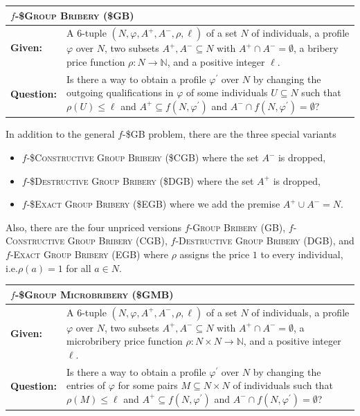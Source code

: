 \documentclass[
    12pt,               %
    a4paper,            %
    bibtotoc,           %
    pointlessnumbers,   %
    ngerman,            %
    titlepage,          %
    leqno,              %
    ]{scrarticle}       %
\begin{document}
\bigskip

\begin{tabularx}{\textwidth}{lX}
\hline
\multicolumn{2}{l}{
$f$-\textsc{\$Group Bribery} (\$GB)
} \\
\hline
\textbf{Given:} &
A 6-tuple $(N, \varphi, A^+, A^-, \rho, \ell)$ of a set $N$ of individuals, a profile $\varphi$ over $N$, two subsets $A^+, A^- \subseteq N$ with $A^+ \cap A^- = \emptyset$, a bribery price function $\rho : N \rightarrow \mathbb{N}$, and a positive integer $\ell$. \\
\textbf{Question:} &
Is there a way to obtain a profile $\varphi^\prime$ over $N$ by changing the outgoing qualifications in $\varphi$ of some individuals $U \subseteq N$ such that $\rho(U) \leq \ell$ and $A^+ \subseteq f(N, \varphi^\prime)$ and $A^- \cap f(N, \varphi^\prime) = \emptyset$? \\
\hline
\end{tabularx}



In addition to the general $f$-\$GB problem, there are the three special variants
\begin{itemize}
\item
$f$-\textsc{\$Constructive Group Bribery} (\$CGB) where the set $A^-$ is dropped,
\item
$f$-\textsc{\$Destructive Group Bribery} (\$DGB) where the set $A^+$ is dropped,
\item
$f$-\textsc{\$Exact Group Bribery} (\$EGB) where we add the premise $A^+ \cup A^- = N$.
\end{itemize}

Also, there are the four unpriced versions $f$-\textsc{Group Bribery} (GB), $f$-\textsc{Constructive Group Bribery} (CGB), $f$-\textsc{Destructive Group Bribery} (DGB), and $f$-\textsc{Exact Group Bribery} (EGB) where $\rho$ assigns the price $1$ to every individual, i.e.\@ $\rho(a) = 1$ for all $a \in N$.



\bigskip

\begin{tabularx}{\textwidth}{lX}
\hline
\multicolumn{2}{l}{
$f$-\textsc{\$Group Microbribery} (\$GMB)
} \\
\hline
\textbf{Given:} &
A 6-tuple $(N, \varphi, A^+, A^-, \rho, \ell)$ of a set $N$ of individuals, a profile $\varphi$ over $N$, two subsets $A^+, A^- \subseteq N$ with $A^+ \cap A^- = \emptyset$, a microbribery price function $\rho : N \times N \rightarrow \mathbb{N}$, and a positive integer $\ell$. \\
\textbf{Question:} &
Is there a way to obtain a profile $\varphi^\prime$ over $N$ by changing the entries of $\varphi$ for some pairs $M \subseteq N \times N$ of individuals such that $\rho(M) \leq \ell$ and $A^+ \subseteq f(N, \varphi^\prime)$ and $A^- \cap f(N, \varphi^\prime) = \emptyset$? \\
\hline
\end{tabularx}
\end{document}

